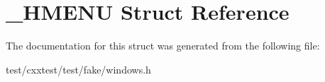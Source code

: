 \hypertarget{struct__HMENU}{\section{\-\_\-\-H\-M\-E\-N\-U Struct Reference}
\label{struct__HMENU}
}


The documentation for this struct was generated from the following file\-:\begin{DoxyCompactItemize}
\item 
test/cxxtest/test/fake/windows.\-h\end{DoxyCompactItemize}
